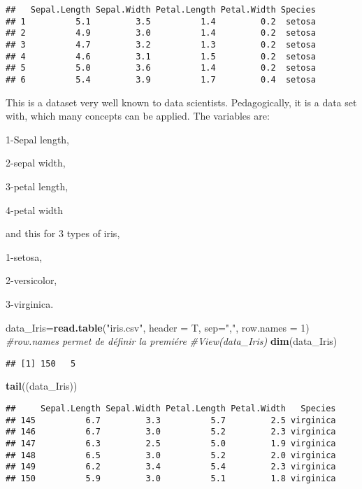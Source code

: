 \documentclass[
]{article}
\newenvironment{Shaded}{\begin{snugshade}}{\end{snugshade}}
\newcommand{\AttributeTok}[1]{\textcolor[rgb]{0.13,0.29,0.53}{#1}}
\newcommand{\CommentTok}[1]{\textcolor[rgb]{0.56,0.35,0.01}{\textit{#1}}}
\newcommand{\DecValTok}[1]{\textcolor[rgb]{0.00,0.00,0.81}{#1}}
\newcommand{\FunctionTok}[1]{\textcolor[rgb]{0.13,0.29,0.53}{\textbf{#1}}}
\newcommand{\NormalTok}[1]{#1}
\newcommand{\OtherTok}[1]{\textcolor[rgb]{0.56,0.35,0.01}{#1}}
\newcommand{\StringTok}[1]{\textcolor[rgb]{0.31,0.60,0.02}{#1}}
\begin{document}
\begin{verbatim}
##   Sepal.Length Sepal.Width Petal.Length Petal.Width Species
## 1          5.1         3.5          1.4         0.2  setosa
## 2          4.9         3.0          1.4         0.2  setosa
## 3          4.7         3.2          1.3         0.2  setosa
## 4          4.6         3.1          1.5         0.2  setosa
## 5          5.0         3.6          1.4         0.2  setosa
## 6          5.4         3.9          1.7         0.4  setosa
\end{verbatim}

This is a dataset very well known to data scientists. Pedagogically, it
is a data set with, which many concepts can be applied. The variables
are:

1-Sepal length,

2-sepal width,

3-petal length,

4-petal width

and this for 3 types of iris,

1-setosa,

2-versicolor,

3-virginica.

\begin{Shaded}
\begin{Highlighting}[]
\NormalTok{data\_Iris}\OtherTok{=}\FunctionTok{read.table}\NormalTok{(}\StringTok{"iris.csv"}\NormalTok{, }\AttributeTok{header =}\NormalTok{ T, }\AttributeTok{sep=}\StringTok{","}\NormalTok{, }\AttributeTok{row.names =} \DecValTok{1}\NormalTok{) }\CommentTok{\#row.names permet de définir la premiére }
\CommentTok{\#View(data\_Iris)}
\FunctionTok{dim}\NormalTok{(data\_Iris) }
\end{Highlighting}
\end{Shaded}

\begin{verbatim}
## [1] 150   5
\end{verbatim}

\begin{Shaded}
\begin{Highlighting}[]
\FunctionTok{tail}\NormalTok{((data\_Iris))}
\end{Highlighting}
\end{Shaded}

\begin{verbatim}
##     Sepal.Length Sepal.Width Petal.Length Petal.Width   Species
## 145          6.7         3.3          5.7         2.5 virginica
## 146          6.7         3.0          5.2         2.3 virginica
## 147          6.3         2.5          5.0         1.9 virginica
## 148          6.5         3.0          5.2         2.0 virginica
## 149          6.2         3.4          5.4         2.3 virginica
## 150          5.9         3.0          5.1         1.8 virginica
\end{verbatim}
\end{document}
